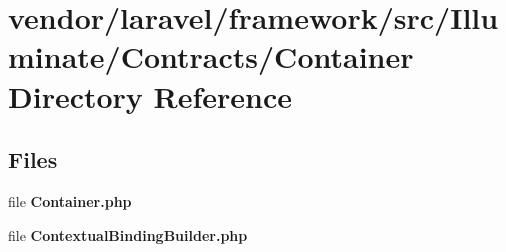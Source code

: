 \section{vendor/laravel/framework/src/\+Illuminate/\+Contracts/\+Container Directory Reference}
\label{dir_f2cea7415fcc2e09cff6c1ac154a3537}
\subsection*{Files}
\begin{DoxyCompactItemize}
\item 
file {\bf Container.\+php}
\item 
file {\bf Contextual\+Binding\+Builder.\+php}
\end{DoxyCompactItemize}
